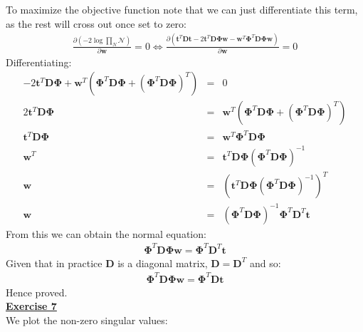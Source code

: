 \documentclass[a4paper, 11pt]{article}
\begin{document}
To maximize the objective function note that we can just differentiate this term, as the rest will cross out once set to zero:
\begin{eqnarray}
\frac{\partial (-2 \log \prod_N \mathcal{N})}{\partial \mathbf{w}} = 0 \Leftrightarrow \frac{\partial \left( \mathbf{t}^T \mathbf{D} \mathbf{t} - 2 \mathbf{t}^T \mathbf{D} \mathbf{\Phi} \mathbf{w} - \mathbf{w}^T \mathbf{\Phi}^T \mathbf{D} \mathbf{\Phi} \mathbf{w} \right)}{\partial \mathbf{w}} = 0 \nonumber
\end{eqnarray}
Differentiating:
\begin{eqnarray}
-2 \mathbf{t}^T \mathbf{D} \mathbf{\Phi} + \mathbf{w}^T \left( \mathbf{\Phi}^T \mathbf{D} \mathbf{\Phi} + \left( \mathbf{\Phi}^T \mathbf{D} \mathbf{\Phi} \right)^T \right) &=& 0 \nonumber \\
2 \mathbf{t}^T \mathbf{D} \mathbf{\Phi} &=& \mathbf{w}^T \left( \mathbf{\Phi}^T \mathbf{D} \mathbf{\Phi} + \left( \mathbf{\Phi}^T \mathbf{D} \mathbf{\Phi} \right)^T \right) \nonumber \\
\mathbf{t}^T \mathbf{D} \mathbf{\Phi} &=& \mathbf{w}^T \mathbf{\Phi}^T \mathbf{D} \mathbf{\Phi} \nonumber \\
\mathbf{w}^T &=& \mathbf{t}^T \mathbf{D} \mathbf{\Phi} \left( \mathbf{\Phi}^T \mathbf{D} \mathbf{\Phi} \right)^{-1} \nonumber \\
\mathbf{w} &=& \left( \mathbf{t}^T \mathbf{D} \mathbf{\Phi} \left( \mathbf{\Phi}^T \mathbf{D} \mathbf{\Phi} \right)^{-1} \right)^T \nonumber \\
\mathbf{w} &=& \left( \mathbf{\Phi}^T \mathbf{D} \mathbf{\Phi} \right)^{-1} \mathbf{\Phi}^T \mathbf{D}^T \mathbf{t} \nonumber
\end{eqnarray}
From this we can obtain the normal equation:
\begin{eqnarray}
\mathbf{\Phi}^T \mathbf{D} \mathbf{\Phi} \mathbf{w} = \mathbf{\Phi}^T \mathbf{D}^T \mathbf{t} \nonumber
\end{eqnarray}
Given that in practice $\mathbf{D}$ is a diagonal matrix, $\mathbf{D} = \mathbf{D}^T$ and so:
\begin{eqnarray}
\mathbf{\Phi}^T \mathbf{D} \mathbf{\Phi} \mathbf{w} = \mathbf{\Phi}^T \mathbf{D} \mathbf{t} \nonumber
\end{eqnarray}
Hence proved.\\
\newpage
\textbf{\underline{Exercise 7}}\\
\newline We plot the non-zero singular values:\\
\end{document}
